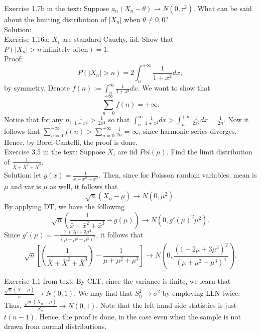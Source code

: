 \documentclass[11pt]{article} \pagestyle{plain}
\def\beq{\begin{equation}}
\def\eeq{\end{equation}}
\begin{document}
\noindent Exercise 1.7b in the text:  Suppose $a_{n}(X_{n}-\theta)\to N(0,\tau^{2})$. What can be said about the limiting distribution of $|X_{n}|$ when $\theta \neq 0, 0$?\\

\noindent Solution: \\


\noindent Exercise 1.16a: $X_{i}$ are standard Cauchy, iid. Show that $P(|X_{n}|>n \ \text{infinitely often}) = 1$.\\

\noindent Proof: \beq P(|X_{n}|>n) = 2\int_{n}^{+\infty}\frac{1}{1+x^{2}}dx,\eeq by symmetry. Denote $f(n):=\int_{n}^{\infty}\frac{1}{1+x^{2}}dx$. We want to show that \beq \sum_{n=0}^{+\infty}f(n)=+\infty.\eeq
Notice that for any $n$, $\frac{1}{1+x^{2}}>\frac{1}{2x^{2}}$ so that $\int_{n}^{\infty}\frac{1}{1+x^{2}}dx>\int_{n}^{+\infty}\frac{1}{2x^{2}}dx = \frac{1}{2n}$. Now it follows that $\sum_{n=0}^{+\infty}f(n)>\sum_{n=0}^{+\infty}\frac{1}{2n}=\infty$, since harmonic series diverges. Hence, by Borel-Cantelli, the proof is done.\\



\noindent Exercise 3.5 in the text: Suppose $X_{i}$ are iid $Poi(\mu)$. Find the limit distribution of $\frac{1}{\bar{X}+\bar{X}^{2}+\bar{X}^{3}}$.\\

\noindent Solution:  let $g(x) = \frac{1}{x+x^{2}+x^{3}}$. Then, since for Poisson random variables, mean is $\mu$ and var is $\mu$ as well, it follows that 
\beq \sqrt{n}(\bar{X_{n}}-\mu) \to N(0, \mu^{2}).\eeq
By applying DT, we have the following
\beq \sqrt{n}\left(\frac{1}{\bar{x}+\bar{x}^{2}+\bar{x}^{3}}-g(\mu)\right) \to N(0, g'(\mu)^{2}\mu^{2}).\eeq
Since $g'(\mu) = -\frac{1+2\mu+3\mu^{2}}{(\mu+\mu^{2}+\mu^{3})^{2}}$, it follows that 
\beq \sqrt{n}\left[\left(\frac{1}{\bar{X}+\bar{X}^{2}+\bar{X}^{3}}\right)-\frac{1}{\mu+\mu^{2}+\mu^{3}}\right] \to N\left(0, \frac{(1+2\mu+3\mu^{3})^{2}}{(\mu+\mu^{2}+\mu^{3})^{4}}\right).\eeq

\vspace{0.5in}

\noindent Exercise 1.1 from text: By CLT, cince the variance is finite, we learn that $\frac{\sqrt{n}(\bar{X}-\mu)}{\sigma} \to N(0,1)$. We may find that $S_{n}^{2}\to \sigma^{2}$ by employing LLN twice. Thus, $\frac{\sqrt{n}(\bar{X_{n}}-\mu)}{S_{n}}\to N(0,1)$. Note that the left hand side statistics is just $t(n-1)$. Hence, the proof is done, in the case even when the sample is not drawn from normal distributions.\\\\\\
\end{document}

